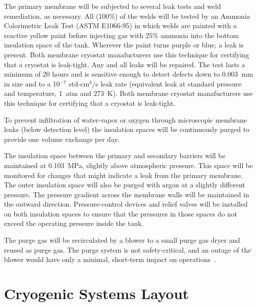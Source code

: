 The primary membrane will be subjected to several leak tests and weld remediation, as necessary.  
All (100\%) of the welds will be tested by an Ammonia Colorimetric Leak Test (ASTM E1066-95) in which welds are painted with a reactive yellow paint before injecting gas with 25\% ammonia into the bottom insulation space of the tank.  Wherever the paint turns purple or blue, a leak is present. Both membrane cryostat manafucturers use this technique for certifying that a cryostat is leak-tight. Any and all leaks will be repaired. The test lasts a minimum of 20 hours and is sensitive enough to detect defects down to 0.003~mm in size and to a 10$^{-7}$ std-cm$^3$/s leak rate (equivalent leak at standard pressure and temperature, 1~atm and 273~K). 
Both membrane cryostat manafucturers use this technique for certifying that a cryostat is leak-tight.


To prevent infiltration of water-vapor or oxygen through microscopic membrane leaks (below detection level) the insulation spaces will be continuously purged to provide one volume exchange per day.  

The insulation space between the primary and 
secondary barriers will be maintained at 0.103~MPa, slightly above atmospheric pressure.  
This space will be monitored for changes that might indicate a leak from the primary membrane.  The outer insulation space will also be purged with argon at a slightly different pressure. The pressure gradient across the membrane walls will be maintained in the outward direction.  Pressure-control devices and relief valves will be installed on both insulation spaces to ensure that the pressures in those spaces do not exceed the operating pressure inside the tank.

The purge gas will be recirculated by a blower to a small purge gas dryer and reused as purge gas. 
The purge system is not safety-critical, and an outage of the blower would have only a minimal, short-term impact on operations~\cite{docdb4303}.

\section{Cryogenic Systems Layout}
\label{sec:cryo-cryosys-layout}

